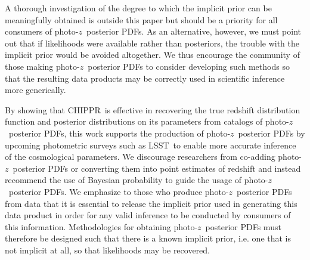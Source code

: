 \documentclass[iop]{emulateapj}
\newcommand{\todo}[3]{{\color{#2}\emph{#1}: #3}}
\newcommand{\aim}[1]{\todo{AIM}{red}{#1}}
\newcommand{\project}[1]{\textsc{#1}}
\newcommand{\lsst}{\project{LSST}}
\newcommand{\Chippr}{\project{CHIPPR}}%
\newcommand{\pz}{photo-$z$}
\newcommand{\pzpdf}{\pz\ posterior PDF}%
\newcommand{\Nz}{$N(z)$}
\begin{document}
A thorough investigation of the degree to which the implicit prior can be meaningfully obtained is outside this paper but should be a priority for all consumers of \pzpdf s.
As an alternative, however, we must point out that if likelihoods were available rather than posteriors, the trouble with the implicit prior would be avoided altogether.
We thus encourage the community of those making \pzpdf s to consider developing such methods so that the resulting data products may be correctly used in scientific inference more generically.




%	

By showing that \Chippr\ is effective in recovering the true redshift distribution function and posterior distributions on its parameters from catalogs of \pzpdf s, this work supports the production of \pzpdf s by upcoming photometric surveys such as \lsst\ to enable more accurate inference of the cosmological parameters.  
We discourage researchers from co-adding \pzpdf s or converting them into point estimates of redshift and instead recommend the use of Bayesian probability to guide the usage of \pzpdf s.  
We emphasize to those who produce \pzpdf s from data that it is essential to release the implicit prior used in generating this data product in order for any valid inference to be conducted by consumers of this information.
Methodologies for obtaining \pzpdf s must therefore be designed such that there is a known implicit prior, i.e. one that is not implicit at all, so that likelihoods may be recovered.
\end{document}
